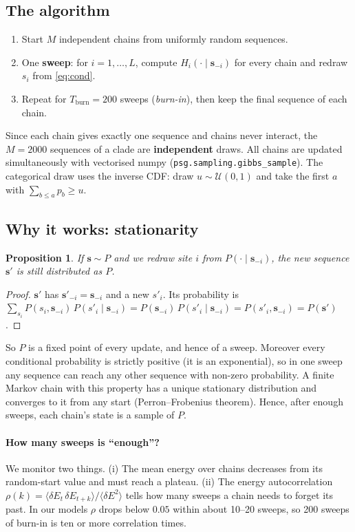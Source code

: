 \documentclass[11pt,a4paper]{article}
\newtheorem{prop}{Proposition}
\newcommand{\s}{\bm{s}}
\begin{document}
\subsection{The algorithm}
\begin{enumerate}[nosep]
  \item Start $M$ independent chains from uniformly random sequences.
  \item One \textbf{sweep}: for $i=1,\dots,L$, compute $H_i(\cdot\mid\s_{-i})$ for every chain and
        redraw $s_i$ from \eqref{eq:cond}.
  \item Repeat for $T_{\text{burn}}=200$ sweeps (\emph{burn-in}), then keep the final sequence of each chain.
\end{enumerate}
Since each chain gives exactly one sequence and chains never interact, the $M=2000$ sequences of a
clade are \textbf{independent} draws. All chains are updated simultaneously with vectorised numpy
(\texttt{psg.sampling.gibbs\_sample}). The categorical draw uses the inverse CDF: draw
$u\sim\mathcal{U}(0,1)$ and take the first $a$ with $\sum_{b\le a}p_b\ge u$.

\subsection{Why it works: stationarity}
\begin{prop}
If $\s\sim P$ and we redraw site $i$ from $P(\cdot\mid\s_{-i})$, the new sequence $\s'$ is still distributed as $P$.
\end{prop}
\begin{proof}
$\s'$ has $\s'_{-i}=\s_{-i}$ and a new $s'_i$. Its probability is
$\sum_{s_i}P(s_i,\s_{-i})\,P(s'_i\mid\s_{-i}) = P(\s_{-i})\,P(s'_i\mid\s_{-i}) = P(s'_i,\s_{-i}) = P(\s')$.
\end{proof}
So $P$ is a fixed point of every update, and hence of a sweep. Moreover every conditional
probability is strictly positive (it is an exponential), so in one sweep any sequence can reach any
other sequence with non-zero probability. A finite Markov chain with this property has a unique
stationary distribution and converges to it from any start (Perron--Frobenius theorem). Hence, after
enough sweeps, each chain's state is a sample of $P$.

\paragraph{How many sweeps is ``enough''?} We monitor two things. (i) The mean energy over chains
decreases from its random-start value and must reach a plateau. (ii) The energy autocorrelation
$\rho(k)=\langle\delta E_t\,\delta E_{t+k}\rangle/\langle\delta E^2\rangle$ tells how many sweeps a chain needs
to forget its past. In our models $\rho$ drops below $0.05$ within about 10--20 sweeps, so 200 sweeps
of burn-in is ten or more correlation times.
\end{document}
